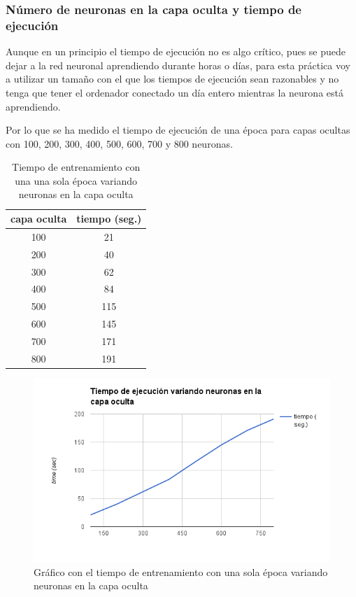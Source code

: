 \subsubsection{Número de neuronas en la capa oculta y tiempo de ejecución}

Aunque en un principio el tiempo de ejecución no es algo crítico, pues se puede dejar a la red neuronal aprendiendo durante horas o días, para esta práctica voy a utilizar un tamaño con el que los tiempos de ejecución sean razonables y no tenga que tener el ordenador conectado un día entero mientras la neurona está aprendiendo.

Por lo que se ha medido el tiempo de ejecución de una época para capas ocultas con 100, 200, 300, 400, 500, 600, 700 y 800 neuronas.
\begin{table}[H]
	\centering
	\caption{Tiempo de entrenamiento con una una sola época variando neuronas en la capa oculta}
	\label{tab:one-epoch-run-time}
	\begin{tabular}{| c | c |}
		\hline
		capa oculta & tiempo (seg.) \\ 
		\hline
		100 & 21 \\
		200 & 40 \\
		300 & 62 \\
		400 & 84 \\
		500 & 115 \\
		600 & 145 \\
		700 & 171 \\
		800 & 191 \\
		\hline
	\end{tabular}
\end{table}

\begin{figure}[H]
\centering
\includegraphics[width=14cm]{img/one-epoch-run-time}
\caption{Gráfico con el tiempo de entrenamiento con una sola época variando neuronas en la capa oculta}
\label{fig:one-epoch-run-time}
\end{figure}

